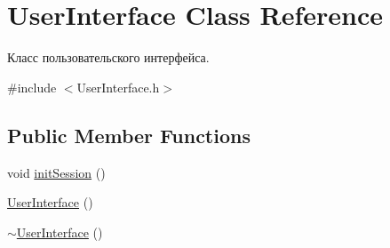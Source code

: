 \hypertarget{class_user_interface}{}\section{User\+Interface Class Reference}
\label{class_user_interface}


Класс пользовательского интерфейса.  




{\ttfamily \#include $<$User\+Interface.\+h$>$}

\subsection*{Public Member Functions}
\begin{DoxyCompactItemize}
\item 
void \hyperlink{class_user_interface_a6c7f9ef9faa40eaf4760d57e89228786}{init\+Session} ()
\item 
\hyperlink{class_user_interface_ae6fb70370701b3bd6120e923df9705b0}{User\+Interface} ()
\item 
\hyperlink{class_user_interface_ae588b2ff1711a016dd4c6fc5002c0841}{$\sim$\+User\+Interface} ()
\end{DoxyCompactItemize}
